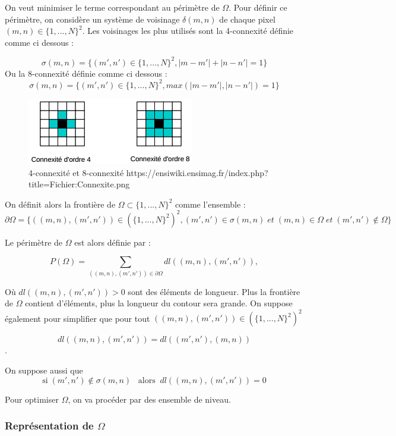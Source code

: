 On veut minimiser le terme correspondant au périmètre de $\Omega$. Pour définir ce périmètre, on considère un système de voisinage $\delta(m,n)$ de chaque pixel $(m,n) \in \{1,...,N\}^2$. Les voisinages les plus utilisés sont la 4-connexité définie comme ci dessous :

\[ \sigma (m,n) = \{ (m',n') \in  \{1,...,N\}^2, |m - m' | + |n - n'| = 1 \}\]
Ou la 8-connexité définie comme ci dessous : 
\[ \sigma (m,n) = \{ (m',n') \in  \{1,...,N\}^2, max(|m - m' | , |n - n'| ) = 1 \}\]

\begin{figure}[H]
\centering
\includegraphics[scale=1]{images/Connexite.png}
\caption{4-connexité et 8-connexité \newline  https://ensiwiki.ensimag.fr/index.php?title=Fichier:Connexite.png}
\end{figure}

On définit alors la frontière de $\Omega \subset \{ 1,...,N\}^2$ comme l'ensemble : 
\[ \partial \Omega = \{ ((m,n),(m',n')) \in (\{ 1,...,N\}^2)^2, (m',n') \in \sigma (m,n) \; et \; (m,n)\in \Omega \; et \; (m',n') \notin \Omega \}\] 

Le périmètre de $\Omega$ est alors définie par : 

\[ P(\Omega) = \sum \limits_{((m,n),(m',n')) \in \partial \Omega} dl((m,n),(m',n')),\] 

Où $ dl((m,n),(m',n')) > 0$ sont des éléments de longueur. Plus la frontière de $\Omega$ contient d'éléments, plus la longueur du contour sera grande. On suppose également pour simplifier que pour tout $((m,n), (m',n')) \in (\{ 1,...,N\}^2)^2$ 

\[ dl((m,n),(m',n')) = dl((m',n'),(m,n))\].

On suppose aussi que 
\[ \text{si} \; (m',n') \notin \sigma (m,n) \; \; \; \text{alors} \; \; dl((m,n),(m',n')) = 0\]

Pour optimiser $\Omega$, on va procéder par des ensemble de niveau. 

\subsubsection{Représentation de \texorpdfstring{$\Omega$}{Lg}}

